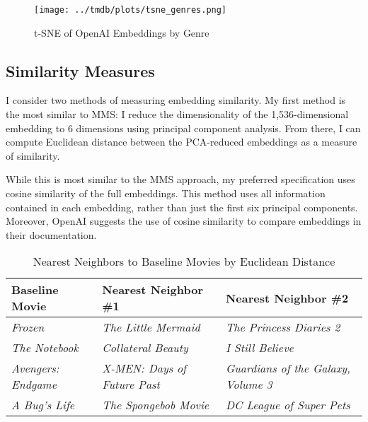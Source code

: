 \documentclass{article}
\begin{document}
\begin{figure}
    \texttt{[image: ../tmdb/plots/tsne\_genres.png]}
    \caption{t-SNE of OpenAI Embeddings by Genre}
    \label{fig:tsne}
\end{figure}


\subsection{Similarity Measures}

I consider two methods of measuring embedding similarity. My first method is the most similar to MMS: I reduce the dimensionality of the 1,536-dimensional embedding to 6 dimensions using principal component analysis. From there, I can compute Euclidean distance between the PCA-reduced embeddings as a measure of similarity. 

While this is most similar to the MMS approach, my preferred specification uses cosine similarity of the full embeddings. This method uses all information contained in each embedding, rather than just the first six principal components. Moreover, OpenAI suggests the use of cosine similarity to compare embeddings in their documentation. 


\begin{table}[]
    \begin{center}
        \begin{tabular}{@{}lll@{}}
        \toprule
        \textbf{Baseline Movie}    & \textbf{Nearest Neighbor \#1}       & \textbf{Nearest Neighbor \#2}              \\ \midrule
        \textit{Frozen}            & \textit{The Little Mermaid}         & \textit{The Princess Diaries 2}            \\
        \textit{The Notebook}      & \textit{Collateral Beauty}          & \textit{I Still Believe}                   \\
        \textit{Avengers: Endgame} & \textit{X-MEN: Days of Future Past} & \textit{Guardians of the Galaxy, Volume 3} \\
        \textit{A Bug's Life}      & \textit{The Spongebob Movie}        & \textit{DC League of Super Pets}           \\ \bottomrule
        \end{tabular}
        \caption{Nearest Neighbors to Baseline Movies by Euclidean Distance}
        \label{tab:euclidean}
    \end{center}
\end{table}
\end{document}

